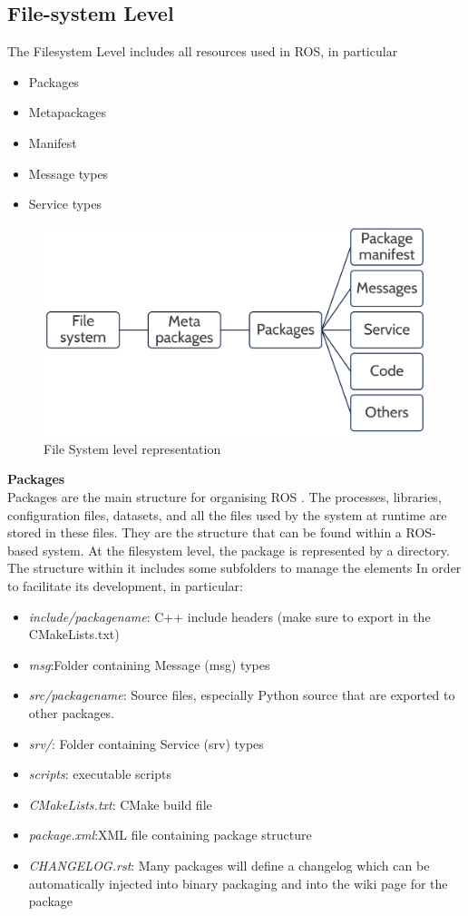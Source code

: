 \subsection{File-system Level}
The Filesystem Level includes all resources used in ROS, in particular
\begin{itemize}
    \item Packages
    \item Metapackages
    \item Manifest
    \item Message types
    \item Service types
\end{itemize}
\begin{figure}
    \centering
    \includegraphics[scale=0.5]{Images/Chapter 1/Filesystem.png}
    \caption{File System level representation}
    \label{fig:Filesystem}
\end{figure}
\textbf{Packages}\\
Packages are the main structure for organising ROS  \citet{rospackages}. The processes, libraries, configuration files, datasets, and all the files used by the system at runtime are stored in these files. They are the structure that can be found within a ROS-based system. At the filesystem level, the package is represented by a directory. The structure within it includes some subfolders to manage the elements
In order to facilitate its development, in particular:
\begin{itemize}
    \item \textit{include/packagename}: C++ include headers (make sure to export in the CMakeLists.txt)
    \item \textit{msg}:Folder containing Message (msg) types
    \item \textit{src/packagename}: Source files, especially Python source that are exported to other packages.
    \item \textit{srv/}: Folder containing Service (srv) types
    \item \textit{scripts}: executable scripts
    \item \textit{CMakeLists.txt}: CMake build file
    \item \textit{package.xml}:XML file containing package structure 
    \item \textit{CHANGELOG.rst}: Many packages will define a changelog which can be automatically injected into binary packaging and into the wiki page for the package
\end{itemize}\\


